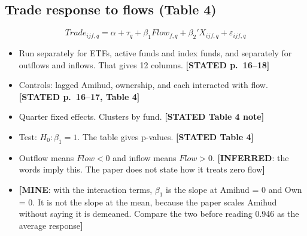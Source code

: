\documentclass[10pt,a4paper]{article}
\newcommand{\ST}[1]{\textcolor{cst}{\textbf{[STATED #1]}}}
\newcommand{\IN}[1]{\textcolor{cin}{\textbf{[INFERRED}: #1\textbf{]}}}
\newcommand{\MY}[1]{\textcolor{cmy}{\textbf{[MINE}: #1\textbf{]}}}
\begin{document}
\subsection{Trade response to flows (Table 4)}
\begin{equation}\label{eq:lou}
\mathit{Trade}_{ijf,q}=\alpha+\tau_q+\beta_1\mathit{Flow}_{f,q}+\beta_2' X_{ijf,q}+\varepsilon_{ijf,q}
\end{equation}
\begin{itemize}
\item Run separately for ETFs, active funds and index funds, and separately for outflows and inflows. That gives 12 columns. \ST{p.~16--18}
\item Controls: lagged Amihud, ownership, and each interacted with flow. \ST{p.~16--17, Table 4}
\item Quarter fixed effects. Clusters by fund. \ST{Table 4 note}
\item Test: $H_0:\beta_1=1$. The table gives p-values. \ST{Table 4}
\item Outflow means $\mathit{Flow}<0$ and inflow means $\mathit{Flow}>0$. \IN{the words imply this. The paper does not state how it treats zero flow}
\item \MY{with the interaction terms, $\beta_1$ is the slope at Amihud = 0 and Own = 0. It is not the slope at the mean, because the paper scales Amihud without saying it is demeaned. Compare the two before reading 0.946 as the average response}
\end{itemize}
\end{document}
